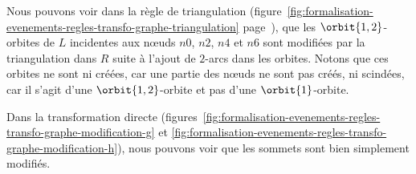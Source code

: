 Nous pouvons voir dans la règle de triangulation
(figure~\ref{fig:formalisation-evenements-regles-transfo-graphe-triangulation}
page~\pageref{fig:formalisation-evenements-regles-transfo-graphe-triangulation}),
que les \(\orbit{1,2}\)-orbites de \(L\) incidentes aux n\oe uds \(n0\), \(n2\),
\(n4\) et \(n6\) sont modifiées par la triangulation dans \(R\) suite à l'ajout
de \(2\)-arcs dans les orbites. %
Notons que ces orbites ne sont ni créées, car une partie des n\oe uds ne sont
pas créés, ni scindées, car il s'agit d'une \(\orbit{1,2}\)-orbite et pas d'une
\(\orbit{1}\)-orbite. %

Dans la transformation directe
(figures~\ref{fig:formalisation-evenements-regles-transfo-graphe-modification-g} et \ref{fig:formalisation-evenements-regles-transfo-graphe-modification-h}),
nous pouvons voir que les sommets sont bien simplement modifiés. %



